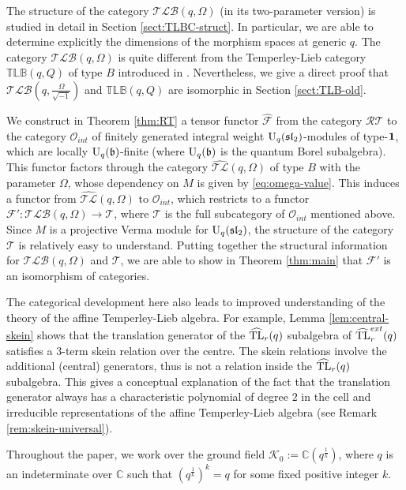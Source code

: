 \documentclass[12pt]{amsart}
\theoremstyle{definition}
\theoremstyle{remark}
\numberwithin{equation}{section}
\newcommand{\C}{{\mathbb C}}
\newcommand{\CF}{{\mathcal F}}
\newcommand{\CO}{{\mathcal O}}
\newcommand{\CK}{{\mathcal K}}
\newcommand{\CT}{{\mathcal T}}
\newcommand{\mf}{\mathfrak}
\newcommand{\fb}{{\mf b}}
\newcommand{\U}{{\rm{U}}}
\newcommand{\Hom}{{\rm{Hom}}}
\newcommand{\tl}{Temperley-Lieb }
\newcommand{\fsl}{{\mathfrak {sl}}}
\newcommand{\HTL}{\widehat{\rm TL}}
\newcommand{\ATLC}{{\widehat{\mathcal{TL}}}}
\newcommand{\TLBB}{{\mathbb{TLB}}}
\newcommand{\TLBC}{\mathcal{TLB}}
\newcommand{\RTC}{\mathcal{RT}}
\begin{document}
The structure of the category $\TLBC(q, \Omega)$ (in its two-parameter version) is studied in detail in 
Section \ref{sect:TLBC-struct}. In particular, we are able to determine explicitly the dimensions of the morphism 
spaces at  generic $q$.  The category $\TLBC(q, \Omega)$ is quite different from the 
\tl category $\TLBB(q,Q)$ of type $B$ introduced in \cite{GL03}. Nevertheless, we give a 
direct proof that $\TLBC(q, \frac{\Omega}{\sqrt{-1}})$ and $\TLBB(q,Q)$ are isomorphic in Section \ref{sect:TLB-old}. 

We construct in Theorem \ref{thm:RT} a tensor functor $\widehat\CF$ from the category $\RTC$ to the category 
$\CO_{int}$ of finitely generated integral weight $\U_q(\fsl_2)$-modules of type-${\bf 1}$, which are locally
$\U_q(\fb)$-finite   (where $\U_q(\fb)$ is 
the quantum Borel subalgebra). This functor factors through the category $\ATLC(q, \Omega)$ of type $B$ 
with the parameter $\Omega$, whose  dependency on $M$ is given by \eqref{eq:omega-value}. This induces a functor from $\ATLC(q, \Omega)$ to $\CO_{int}$,
 which restricts to a functor $\CF': \TLBC(q, \Omega) \longrightarrow \CT$, where $\CT$ is the full 
 subcategory of $\CO_{int}$ mentioned above. 
Since $M$ is a projective Verma module for $\U_q(\fsl_2)$, the  structure of the category $\CT$ is relatively easy to understand. 
 Putting together the structural information for $\TLBC(q, \Omega)$  and $\CT$,  we are able to show  in 
 Theorem \ref{thm:main} that $\CF'$ is an isomorphism of categories. 



The categorical development here also leads to improved understanding of the theory of the affine \tl algebra. 
For example, Lemma \ref{lem:central-skein} shows that  the translation generator of 
the  $\HTL_r(q)$ subalgebra of  $\HTL^{ext}_r(q)$ 
satisfies a $3$-term skein relation over the centre. The skein relations involve the additional (central) generators, 
thus is not a relation inside the $\HTL_r(q)$ subalgebra.  This gives a conceptual explanation of the fact \cite{GL03} 
that the translation generator always has a characteristic polynomial of degree $2$  in the cell  and irreducible 
representations of the affine \tl algebra (see Remark \ref{rem:skein-universal}).   


Throughout the paper, we work over the ground field $\CK_0:=\C(q^{\frac{1}{k}})$, where $q$ is an indeterminate over $\C$ such that $(q^{\frac{1}{k}})^k=q$
for some fixed positive integer $k$. 
\end{document}
